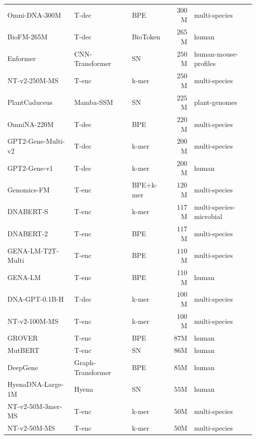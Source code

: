 \documentclass{article}
\theoremstyle{plain}
\theoremstyle{definition}
\theoremstyle{remark}
\begin{document}
\begin{table}[h]
\begin{tabular}{@{}lllrl@{}}
Omni-DNA-300M             & T-dec               & BPE        & $300$M & multi-species \\
BioFM-265M                & T-dec               & BioToken   & $265$M & human \\
Enformer                  & CNN-Transformer     & SN         & $250$M & human-mouse-profiles \\
NT-v2-250M-MS             & T-enc               & k-mer      & $250$M & multi-species \\
PlantCaduceus             & Mamba-SSM           & SN         & $225$M & plant-genomes \\
OmniNA-220M               & T-dec               & BPE        & $220$M & multi-species \\
GPT2-Gene-Multi-v2        & T-dec               & k-mer      & $200$M & multi-species \\
GPT2-Gene-v1              & T-dec               & k-mer      & $200$M & human \\
Genomics-FM               & T-enc               & BPE+k-mer  & $120$M & multi-species \\
DNABERT-S                 & T-enc               & k-mer      & $117$M & multi-species-microbial \\
DNABERT-2                 & T-enc               & BPE        & $117$M & multi-species \\
GENA-LM-T2T-Multi         & T-enc               & BPE        & $110$M & multi-species \\
GENA-LM                   & T-enc               & BPE        & $110$M & human \\
DNA-GPT-0.1B-H            & T-dec               & k-mer      & $100$M & multi-species \\
NT-v2-100M-MS             & T-enc               & k-mer      & $100$M & multi-species \\
GROVER                    & T-enc               & BPE        & $87$M  & human \\
MutBERT                   & T-enc               & SN         & $86$M  & human \\
DeepGene                  & Graph-Transformer   & BPE        & $85$M  & human \\
HyenaDNA-Large-1M         & Hyena               & SN         & $55$M  & human \\
NT-v2-50M-3mer-MS         & T-enc               & k-mer      & $50$M  & multi-species \\
NT-v2-50M-MS              & T-enc               & k-mer      & $50$M  & multi-species \\

\end{tabular}
\end{table}
\end{document}
